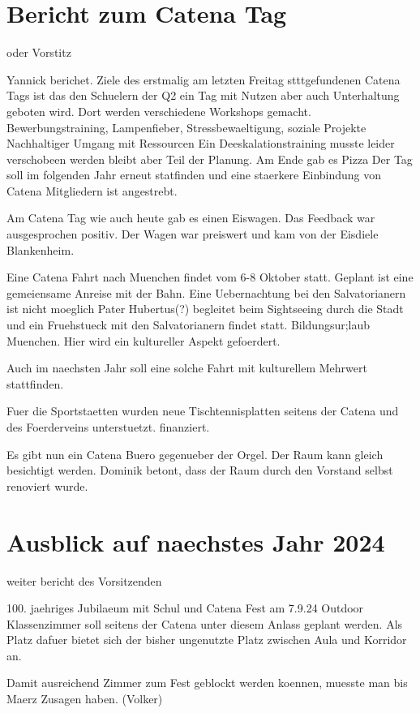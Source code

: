 \documentclass[a4paper, 11pt]{article}
\begin{document}
\section*{Bericht zum Catena Tag} oder Vorstitz

Yannick berichet.
Ziele des erstmalig am letzten Freitag stttgefundenen Catena Tags ist das den Schuelern der Q2
ein Tag mit Nutzen aber auch Unterhaltung geboten wird.
Dort werden verschiedene Workshops gemacht. Bewerbungstraining, Lampenfieber, Stressbewaeltigung, soziale Projekte
Nachhaltiger Umgang mit Ressourcen
Ein Deeskalationstraining musste leider verschobeen werden bleibt aber Teil der Planung.
Am Ende gab es Pizza
Der Tag soll im folgenden Jahr erneut statfinden und eine staerkere Einbindung von Catena Mitgliedern ist angestrebt.

Am Catena Tag wie auch heute gab es einen Eiswagen. Das Feedback war ausgesprochen positiv.
Der Wagen war preiswert und kam von der Eisdiele Blankenheim.

Eine Catena Fahrt nach Muenchen findet vom 6-8 Oktober statt.
Geplant ist eine gemeiensame Anreise mit der Bahn. Eine Uebernachtung bei den Salvatorianern ist nicht moeglich
Pater Hubertus(?) begleitet beim Sightseeing durch die Stadt und ein Fruehstueck mit den Salvatorianern findet statt.
Bildungsur;laub Muenchen. Hier wird ein kultureller Aspekt gefoerdert.

Auch im naechsten Jahr soll eine solche Fahrt mit kulturellem Mehrwert stattfinden.


Fuer die Sportstaetten wurden neue Tischtennisplatten seitens der Catena und des Foerderveins unterstuetzt. finanziert.

Es gibt nun ein Catena Buero gegenueber der Orgel.
Der Raum kann gleich besichtigt werden.
Dominik betont, dass der Raum durch den Vorstand selbst renoviert wurde.


\section*{Ausblick auf naechstes Jahr 2024} weiter bericht des Vorsitzenden

100. jaehriges Jubilaeum mit Schul und Catena Fest am 7.9.24
Outdoor Klassenzimmer soll seitens der Catena unter diesem Anlass geplant werden.
Als Platz dafuer bietet sich der bisher ungenutzte Platz zwischen Aula und Korridor an.

Damit ausreichend Zimmer zum Fest geblockt werden koennen, muesste man bis Maerz Zusagen haben. (Volker)
\end{document}
